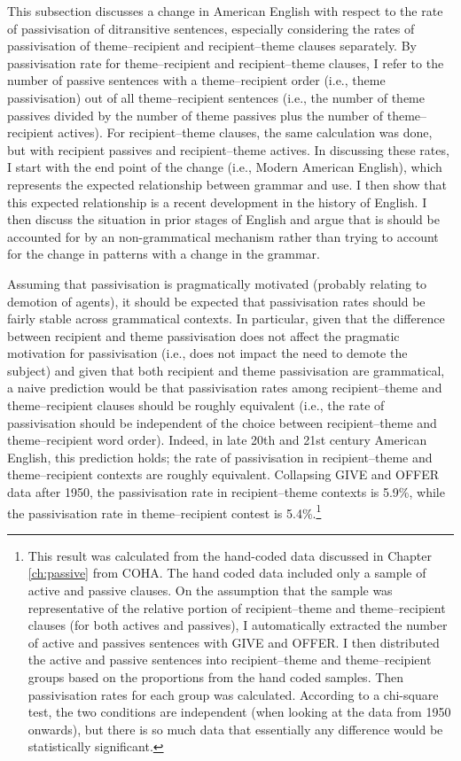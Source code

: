 	This subsection discusses a change in American English with respect to the rate of passivisation of ditransitive sentences, especially considering the rates of passivisation of theme--recipient and recipient--theme clauses separately. By passivisation rate for theme--recipient and recipient--theme clauses, I refer to the number of passive sentences with a theme--recipient order (i.e., theme passivisation) out of all theme--recipient sentences (i.e., the number of theme passives divided by the number of theme passives plus the number of theme--recipient actives). For recipient--theme clauses, the same calculation was done, but with recipient passives and recipient--theme actives. In discussing these rates, I start with the end point of the change (i.e., Modern American English), which represents the expected relationship between grammar and use. I then show that this expected relationship is a recent development in the history of English. I then discuss the situation in prior stages of English and argue that is should be accounted for by an non-grammatical mechanism rather than trying to account for the change in patterns with a change in the grammar.

	Assuming that passivisation is pragmatically motivated (probably relating to demotion of agents), it should be expected that passivisation rates should be fairly stable across grammatical contexts. In particular, given that the difference between recipient and theme passivisation does not affect the pragmatic motivation for passivisation (i.e., does not impact the need to demote the subject) and given that both recipient and theme passivisation are grammatical, a naive prediction would be that passivisation rates among recipient--theme and theme--recipient clauses should be roughly equivalent (i.e., the rate of passivisation should be independent of the choice between recipient--theme and theme--recipient word order). Indeed, in late 20th and 21st century American English, this prediction holds; the rate of passivisation in recipient--theme and theme--recipient contexts are roughly equivalent. Collapsing GIVE and OFFER data after 1950, the passivisation rate in recipient--theme contexts is 5.9\%, while the passivisation rate in theme--recipient contest is 5.4\%.\footnote{This result was calculated from the hand-coded data discussed in Chapter \ref{ch:passive} from COHA. The hand coded data included only a sample of active and passive clauses. On the assumption that the sample was representative of the relative portion of recipient--theme and theme--recipient clauses (for both actives and passives), I automatically extracted the number of active and passives sentences with GIVE and OFFER. I then distributed the active and passive sentences into recipient--theme and theme--recipient groups based on the proportions from the hand coded samples. Then passivisation rates for each group was calculated. According to a chi-square test, the two conditions are independent (when looking at the data from 1950 onwards), but there is so much data that essentially any difference would be statistically significant.}
	
